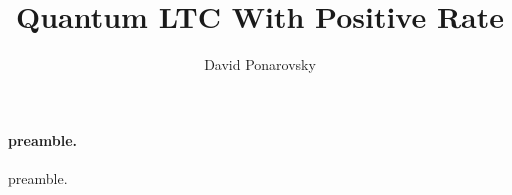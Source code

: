 \documentclass{article}
\begin{document}
\title{Quantum LTC With Positive Rate}
\author{David Ponarovsky}
\maketitle
\begin{multicols*}{2}
\newcommand{ \Hw }{ \delta\Delta -\Delta^{\frac{1}{2}-\varepsilon}/\delta  }
	\newcommand{ \Nw }{ \Delta^{\frac{3}{2}-\varepsilon}} 
	  \newcommand{ \Gu } { \Gamma^{\cup} }
	  \newcommand{ \Guq } { \Gamma^{\cup, \square} }

    	\newcommand{ \Gsa } {\Gamma_{\square_{1}} }
	\newcommand{ \Gsb } {\Gamma_{\square_{2}} }
        \newcommand{ \Aa } { C_{A_{1}}}  
	\newcommand{ \Ab } { C_{A_{2}}}
	\newcommand{ \Ac } { C_{A_{3}}}
	\newcommand{ \Ad } { C_{A_{4}}}
	\newcommand{ \Aab } { \Aa \otimes \Ab } 
	\newcommand{ \Acd } { \Ac \otimes \Ad } 
	\newcommand{ \Aac } { \Aa \otimes \Ac }
	\newcommand{ \Aabc } { \Aa \otimes \Ab \otimes \Ac }
	\newcommand{ \Aabp } { \Aa^{\perp} \otimes \Ab^{\perp} } 
	\newcommand{ \Aacp } { \Aa^{\perp} \otimes \Ac^{\perp} }
	\newcommand{ \Aabcp } { \Aa^{\perp} \otimes \Ab^{\perp} \otimes \Ac^{\perp} }
	\newcommand{ \Aabpp } { \left( \Aabp \right)^\perp } 
	\newcommand{ \Aacpp } { \left( \Aacp \right)^\perp }
	\newcommand{ \Aabcpp } { \left( \Aabcp \right)^\perp }
	\newcommand{ \YY } {  y_{1}y_{2}^{\top} }
	\newcommand{ \ZZ } {  z_{1}z_{2}^{\top} } 
	\newcommand{ \TT } { \tilde{\tau} } 


  \paragraph{preamble.} preamble.  

\end{multicols*}
\end{document}

